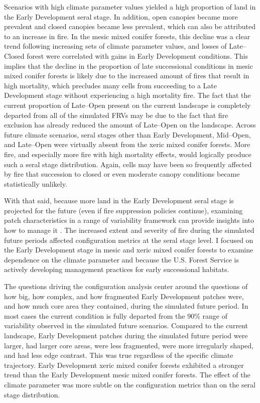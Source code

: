 Scenarios with high climate parameter values yielded a high proportion of land in the Early Development seral stage. In addition, open canopies became more prevalent and closed canopies became less prevalent, which can also be attributed to an increase in fire. In the mesic mixed conifer forests, this decline was a clear trend following increasing sets of climate parameter values, and losses of Late--Closed forest were correlated with gains in Early Development conditions. This implies that the decline in the proportion of late successional conditions in mesic mixed conifer forests is likely due to the increased amount of fires that result in high mortality, which precludes many cells from succeeding to a Late Development stage without experiencing a high mortality fire. The fact that the current proportion of Late--Open present on the current landscape is completely departed from all of the simulated FRVs may be due to the fact that fire exclusion has already reduced the amount of Late--Open on the landscape. Across future climate scenarios, seral stages other than Early Development, Mid--Open, and Late--Open were virtually absent from the xeric mixed conifer forests. More fire, and especially more fire with high mortality effects, would logically produce such a seral stage distribution. Again, cells may have been so frequently affected by fire that succession to closed or even moderate canopy conditions became statistically unlikely.

With that said, because more land in the Early Development seral stage is projected for the future (even if fire suppression policies continue), examining patch characteristics in a range of variability framework can provide insights into how to manage it \citep{McGarigal2005,McGarigal2005a}. The increased extent and severity of fire during the simulated future periods affected configuration metrics at the seral stage level. I focused on the Early Development stage in mesic and xeric mixed conifer forests to examine dependence on the climate parameter and because the U.S. Forest Service is actively developing management practices for early successional habitats. 

The questions driving the configuration analysis center around the questions of how big, how complex, and how fragmented Early Development patches were, and how much core area they contained, during the simulated future period. In most cases the current condition is fully departed from the 90\% range of variability observed in the simulated future scenarios. Compared to the current landscape, Early Development patches during the simulated future period were larger, had larger core areas, were less fragmented, were more irregularly shaped, and had less edge contrast. This was true regardless of the specific climate trajectory. Early Development xeric mixed conifer forests exhibited a stronger trend than the Early Development mesic mixed conifer forests. The effect of the climate parameter was more subtle on the configuration metrics than on the seral stage distribution.

